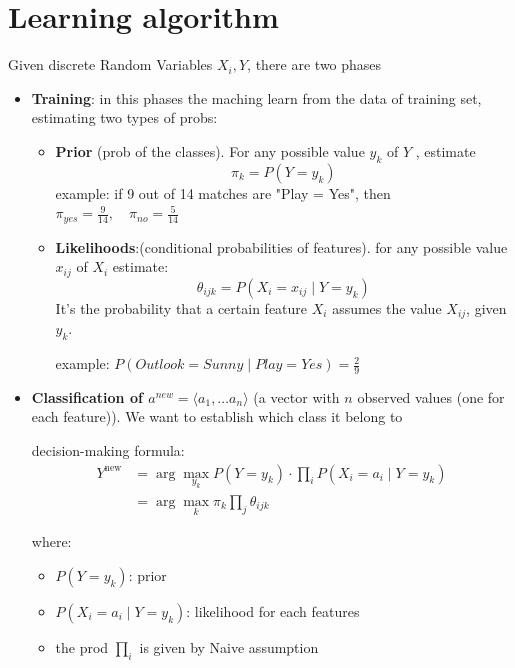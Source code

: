 
\section{Learning algorithm}
Given discrete Random Variables $X_i, Y$, there are two phases
\begin{itemize}
    \item \textbf{Training}: in this phases the maching learn from the data of training set, estimating two types of probs:
    \begin{itemize}
        \item \textbf{Prior} (prob of the classes). For any possible value $y_k$ of $Y$ , estimate
        \[
            \pi_k = P(Y = y_k)
        \]
        example: if 9 out of 14 matches are "Play = Yes", then $\pi_{yes}= \frac{9}{14},\quad \pi_{no}= \frac{5}{14} $

        \item \textbf{Likelihoods}:(conditional probabilities of features). for any possible value $x_{ij}$ of $X_i$ estimate:
        \[
            \theta_{ijk} = P(X_i = x_{ij}\mid Y = y_k)
        \]
        It's the probability that a certain feature $X_i$ assumes the value $X_{ij}$, given $y_k$.

        example: $P(Outlook=Sunny\mid Play=Yes)=\frac{2}{9}$
    \end{itemize}
    \item \textbf{Classification of $a^{new} = \langle a_1 , \dots a_n \rangle$} (a vector with $n$ observed values (one for each feature)). We want to establish which class it belong to
    
    decision-making formula:
    \[
    \begin{aligned}
    Y^{\text{new}} &= \arg \max_{y_k} P(Y = y_{k}) \cdot \prod_{i} P(X_{i} = a_{i} \mid Y = y_{k}) \\
    &= \arg \max_{k} \pi_{k} \prod_{j} \theta_{ijk}
    \end{aligned}
    \]

    where:
    \begin{itemize}
        \item $P(Y=y_k)$: prior
        \item $P(X_i=a_i\mid Y=y_k)$: likelihood for each features
        \item the prod $\prod_{i}$ is given by Naive assumption
    \end{itemize}
\end{itemize}

